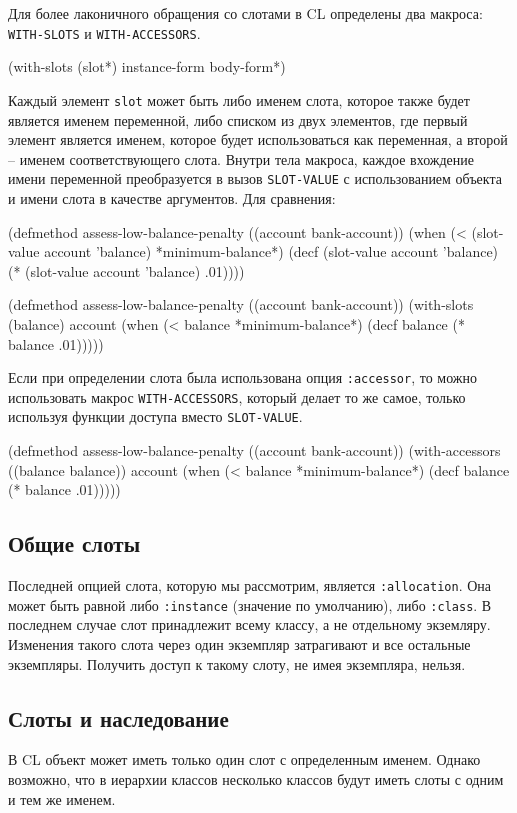 Для более лаконичного обращения со слотами в CL определены два макроса: \lstinline{WITH-SLOTS} и \lstinline{WITH-ACCESSORS}.
\begin{cllst}{}{}
(with-slots (slot*) instance-form
  body-form*)
\end{cllst}

Каждый элемент \lstinline{slot} может быть либо именем слота, которое также будет является именем переменной, либо списком из двух элементов, где первый элемент является именем, которое будет использоваться как переменная, а второй – именем соответствующего слота. Внутри тела макроса, каждое вхождение имени переменной преобразуется в вызов \lstinline{SLOT-VALUE} с использованием объекта и имени слота в качестве аргументов. Для сравнения:
\begin{cllst}{}{}
(defmethod assess-low-balance-penalty ((account bank-account))
  (when (< (slot-value account 'balance) *minimum-balance*)
    (decf (slot-value account 'balance) (* (slot-value account 'balance) .01))))

(defmethod assess-low-balance-penalty ((account bank-account))
  (with-slots (balance) account
    (when (< balance *minimum-balance*)
      (decf balance (* balance .01)))))
\end{cllst}

Если при определении слота была использована опция \lstinline{:accessor}, то можно использовать макрос \lstinline{WITH-ACCESSORS}, который делает то же самое, только используя функции доступа вместо \lstinline{SLOT-VALUE}.
\begin{cllst}{}{}
(defmethod assess-low-balance-penalty ((account bank-account))
  (with-accessors ((balance balance)) account
    (when (< balance *minimum-balance*)
      (decf balance (* balance .01)))))
\end{cllst}

\subsection{Общие слоты}
Последней опцией слота, которую мы рассмотрим, является \lstinline{:allocation}. Она может быть равной либо \lstinline{:instance} (значение по умолчанию), либо \lstinline{:class}. В последнем случае слот принадлежит всему классу, а не отдельному экземляру. Изменения такого слота через один экземпляр затрагивают и все остальные экземпляры. Получить доступ к такому слоту, не имея экземпляра, нельзя.

\subsection{Слоты и наследование}
В CL объект может иметь только один слот с определенным именем. Однако возможно, что в иерархии классов несколько классов будут иметь слоты с одним и тем же именем.

